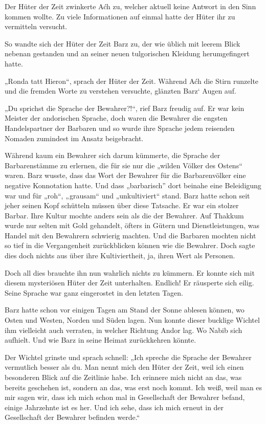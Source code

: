 Der Hüter der Zeit zwinkerte Aćh zu, welcher aktuell keine Antwort in den Sinn kommen wollte. Zu viele Informationen auf einmal hatte der Hüter ihr zu vermitteln versucht.

So wandte sich der Hüter der Zeit Barz zu, der wie üblich mit leerem Blick nebenan gestanden und an seiner neuen tulgorischen Kleidung herumgefingert hatte.

„Ronda tatt Hieron“, sprach der Hüter der Zeit. Während Aćh die Stirn runzelte und die fremden Worte zu verstehen versuchte, glänzten Barz‘ Augen auf.



\trennzeichen



„Du sprichst die Sprache der Bewahrer?!“, rief Barz freudig auf. Er war kein Meister der andorischen Sprache, doch waren die Bewahrer die engsten Handelspartner der Barbaren und so wurde ihre Sprache jedem reisenden Nomaden zumindest im Ansatz beigebracht.

Während kaum ein Bewahrer sich darum kümmerte, die Sprache der Barbarenstämme zu erlernen, die für sie nur die „wilden Völker des Ostens“ waren. Barz wusste, dass das Wort der Bewahrer für die Barbarenvölker eine negative Konnotation hatte. Und dass „barbarisch” dort beinahe eine Beleidigung war und für „roh“, „grausam“ und „unkultiviert“ stand. Barz hatte schon seit jeher seinen Kopf schütteln müssen über diese Tatsache. Er war ein stolzer Barbar. Ihre Kultur mochte anders sein als die der Bewahrer. Auf Thakkum wurde nur selten mit Gold gehandelt, öfters in Gütern und Dienstleistungen, was Handel mit den Bewahrern schwierig machten. Und die Barbaren mochten nicht so tief in die Vergangenheit zurückblicken können wie die Bewahrer. Doch sagte dies doch nichts aus über ihre Kultiviertheit, ja, ihren Wert als Personen.

Doch all dies brauchte ihn nun wahrlich nichts zu kümmern. Er konnte sich mit diesem mysteriösen Hüter der Zeit unterhalten. Endlich! Er räusperte sich eilig. Seine Sprache war ganz eingerostet in den letzten Tagen.

Barz hatte schon vor einigen Tagen am Stand der Sonne ablesen können, wo Osten und Westen, Norden und Süden lagen. Nun konnte dieser bucklige Wichtel ihm vielleicht auch verraten, in welcher Richtung Andor lag. Wo Nabib sich aufhielt. Und wie Barz in seine Heimat zurückkehren könnte.

Der Wichtel grinste und sprach schnell: „Ich spreche die Sprache der Bewahrer vermutlich besser als du. Man nennt mich den Hüter der Zeit, weil ich einen besonderen Blick auf die Zeitlinie habe. Ich erinnere mich nicht an das, was bereits geschehen ist, sondern an das, was erst noch kommt. Ich weiß, weil man es mir sagen wir, dass ich mich schon mal in Gesellschaft der Bewahrer befand, einige Jahrzehnte ist es her. Und ich sehe, dass ich mich erneut in der Gesellschaft der Bewahrer befinden werde.“

